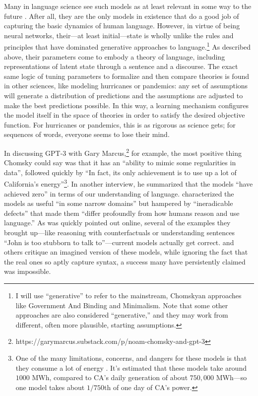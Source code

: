 \documentclass[output=paper,colorlinks,citecolor=brown
]{langscibook}
\begin{document}
Many in language science see such models as at least relevant in some way to the future \citep{bommasani2021opportunities,baroni2022proper,pater2019generative}. After all, they are the only  models in existence that do a good job of capturing the basic dynamics of human language. However, in virtue of being neural networks, their---at least initial---state is wholly unlike the rules and principles that have dominated generative approaches to language.\footnote{I will use ``generative'' to refer to the mainstream, Chomskyan approaches like Government And Binding and Minimalism. Note that some other approaches are also considered ``generative,'' and they may work from different, often more plausible, starting assumptions.} As described above, their parameters come to embody a theory of language, including representations of latent state through a sentence and a discourse. The exact same logic of tuning parameters to formalize and then compare theories is found in other sciences, like modeling hurricanes or pandemics: any set of assumptions will generate a distribution of predictions and the assumptions are adjusted to make the best predictions possible. In this way, a learning mechanism configures the model itself in the space of theories in order to satisfy the desired objective function. For hurricanes or pandemics, this is as rigorous as science gets; for sequences of words, everyone seems to lose their mind.

In discussing GPT-3 with Gary Marcus,\footnote{ https://garymarcus.substack.com/p/noam-chomsky-and-gpt-3} for example, the most positive thing Chomsky could say was that it has an ``ability to mimic some regularities in data'', followed quickly by ``In fact, its only achievement is to use up a lot of California’s energy''\footnote{ One of the many limitations, concerns, and dangers \citep{bender2021dangers,bommasani2021opportunities} for these models is that they consume a lot of energy \citep{strubell2019energy}. It's estimated that these models take around $1000$ MWh, compared to CA's daily generation of about $750,000$ MWh---so one model takes about $1/750$th of one day of CA's power.}. In another interview, he summarized that the models ``have achieved zero'' in terms of our understanding of language. \cite{chomsky2023false} characterized the models as useful ``in some narrow domains'' but hampered by ``ineradicable defects'' that made them ``differ profoundly from how humans reason and use language.'' As was quickly pointed out online, several of the examples they brought up---like reasoning with counterfactuals or understanding sentences ``John is too stubborn to talk to''---current models actually get correct. \cite{chomsky2023false} and others critique an imagined version of these models, while ignoring the fact that the real ones so aptly capture syntax, a success many have persistently claimed was impossible.
\end{document}
